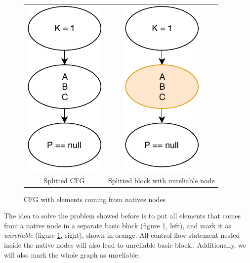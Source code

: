 \begin{figure}[h]
	\caption{CFG with elements coming from natives nodes}
	\label{figure:two-unreliable-cfg}
	\setlength{\tabcolsep}{24pt}
	\begin{tabular}{cc}
		\includegraphics[]{figure/unreliable-cfg-1.pdf}  &
		\includegraphics[]{figure/unreliable-cfg-2.pdf}   \\ 
		Splitted CFG & Splitted block with unreliable node
	\end{tabular}
\end{figure}

The idea to solve the problem showed before is to put all elements that comes from a native node in a separate basic block (figure \ref{figure:two-unreliable-cfg}, left), and mark it as \emph{unreliable} (figure \ref{figure:two-unreliable-cfg}, right), shown in orange. 
All control flow statement nested inside the native nodes will also lead to unreliable basic block.. 
Additionally, we will also mark the whole graph as unreliable. 

